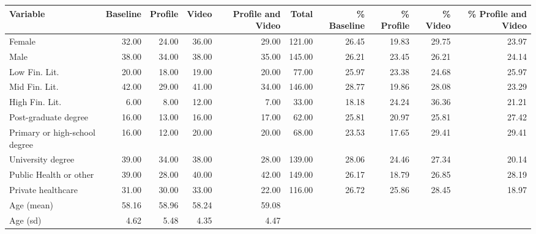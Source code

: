 \begin{tabular}{lrrrrrrrrr}
  \hline
Variable & Baseline & Profile & Video & Profile and Video & Total & \% Baseline & \% Profile & \% Video & \% Profile and Video \\ 
  \hline
Female & 32.00 & 24.00 & 36.00 & 29.00 & 121.00 & 26.45 & 19.83 & 29.75 & 23.97 \\ 
  Male & 38.00 & 34.00 & 38.00 & 35.00 & 145.00 & 26.21 & 23.45 & 26.21 & 24.14 \\ 
  Low Fin. Lit. & 20.00 & 18.00 & 19.00 & 20.00 & 77.00 & 25.97 & 23.38 & 24.68 & 25.97 \\ 
  Mid Fin. Lit. & 42.00 & 29.00 & 41.00 & 34.00 & 146.00 & 28.77 & 19.86 & 28.08 & 23.29 \\ 
  High Fin. Lit. & 6.00 & 8.00 & 12.00 & 7.00 & 33.00 & 18.18 & 24.24 & 36.36 & 21.21 \\ 
  Post-graduate degree & 16.00 & 13.00 & 16.00 & 17.00 & 62.00 & 25.81 & 20.97 & 25.81 & 27.42 \\ 
  Primary or high-school degree & 16.00 & 12.00 & 20.00 & 20.00 & 68.00 & 23.53 & 17.65 & 29.41 & 29.41 \\ 
  University degree & 39.00 & 34.00 & 38.00 & 28.00 & 139.00 & 28.06 & 24.46 & 27.34 & 20.14 \\ 
  Public Health or other & 39.00 & 28.00 & 40.00 & 42.00 & 149.00 & 26.17 & 18.79 & 26.85 & 28.19 \\ 
  Private healthcare & 31.00 & 30.00 & 33.00 & 22.00 & 116.00 & 26.72 & 25.86 & 28.45 & 18.97 \\ 
  Age (mean) & 58.16 & 58.96 & 58.24 & 59.08 &  &  &  &  &  \\ 
  Age (sd) & 4.62 & 5.48 & 4.35 & 4.47 &  &  &  &  &  \\ 
   \hline
\end{tabular}
